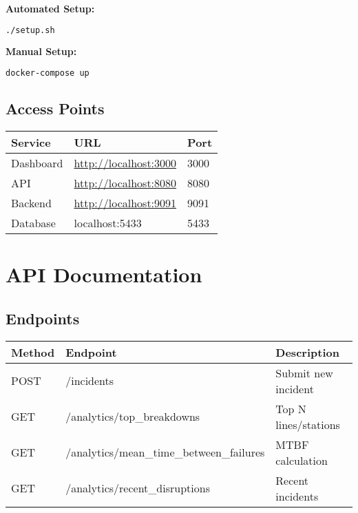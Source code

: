 \documentclass[11pt,a4paper]{article}
\begin{document}
\textbf{Automated Setup:}
\begin{lstlisting}[language=bash]
./setup.sh
\end{lstlisting}

\textbf{Manual Setup:}
\begin{lstlisting}[language=bash]
docker-compose up
\end{lstlisting}

\subsection{Access Points}

\begin{table}[H]
\centering
\begin{tabular}{@{}lll@{}}
\toprule
\textbf{Service} & \textbf{URL} & \textbf{Port} \\ \midrule
Dashboard & \url{http://localhost:3000} & 3000 \\
API & \url{http://localhost:8080} & 8080 \\
Backend & \url{http://localhost:9091} & 9091 \\
Database & localhost:5433 & 5433 \\ \bottomrule
\end{tabular}
\end{table}

\section{API Documentation}

\subsection{Endpoints}

\begin{table}[H]
\centering
\small
\begin{tabular}{@{}llp{6cm}@{}}
\toprule
\textbf{Method} & \textbf{Endpoint} & \textbf{Description} \\ \midrule
POST & /incidents & Submit new incident \\
GET & /analytics/top\_breakdowns & Top N lines/stations \\
GET & /analytics/mean\_time\_between\_failures & MTBF calculation \\
GET & /analytics/recent\_disruptions & Recent incidents \\ \bottomrule
\end{tabular}
\end{table}
\end{document}
